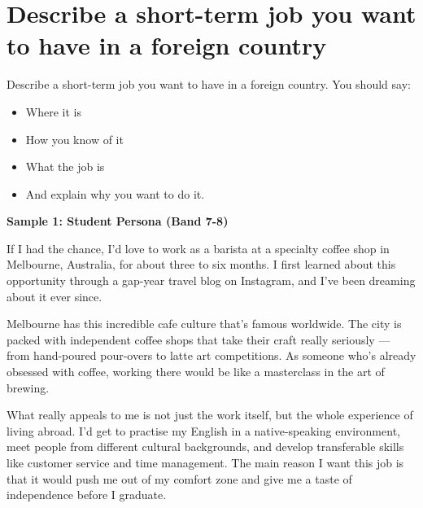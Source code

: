 \newpage

\section{Describe a short-term job you want to have in a foreign country}
\begin{ieltsprompt}
Describe a short-term job you want to have in a foreign country.
You should say:
\begin{itemize}[leftmargin=2em, itemsep=2pt]
\item Where it is
\item How you know of it
\item What the job is
\item And explain why you want to do it.
\end{itemize}
\end{ieltsprompt}
\begin{ieltsanswer}
\textbf{Sample 1: Student Persona (Band 7-8)}

If I had the chance, I'd love to work as a barista at a specialty coffee shop in Melbourne, Australia, for about three to six months. I first learned about this opportunity through a gap-year travel blog on Instagram, and I've been dreaming about it ever since.

Melbourne has this incredible cafe culture that's famous worldwide. The city is packed with independent coffee shops that take their craft really seriously — from hand-poured pour-overs to latte art competitions. As someone who's already obsessed with coffee, working there would be like a masterclass in the art of brewing.

What really appeals to me is not just the work itself, but the whole experience of living abroad. I'd get to practise my English in a native-speaking environment, meet people from different cultural backgrounds, and develop transferable skills like customer service and time management. The main reason I want this job is that it would push me out of my comfort zone and give me a taste of independence before I graduate.
\end{ieltsanswer}


